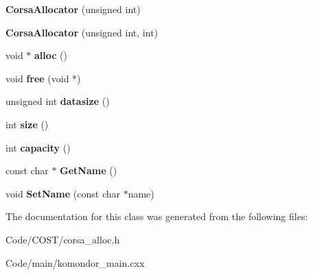 \begin{DoxyCompactItemize}
\mbox{\label{classCorsaAllocator_ac5c54488d1544d2877064a172ea26c68}} 
{\bfseries Corsa\+Allocator} (unsigned int)
\item 
\mbox{\label{classCorsaAllocator_aa4180c34c68b787dcf30e8aad5eb80d2}} 
{\bfseries Corsa\+Allocator} (unsigned int, int)
\item 
\mbox{\label{classCorsaAllocator_a104cedc56c043d4ada9585f5b29b4b52}} 
void $\ast$ {\bfseries alloc} ()
\item 
\mbox{\label{classCorsaAllocator_a3b826bb2f74ba8f778f1db7312c2fb1a}} 
void {\bfseries free} (void $\ast$)
\item 
\mbox{\label{classCorsaAllocator_a4d97e1eee898530930d386df3e48e750}} 
unsigned int {\bfseries datasize} ()
\item 
\mbox{\label{classCorsaAllocator_a3749ea000e4d5fda21ba36256b689f80}} 
int {\bfseries size} ()
\item 
\mbox{\label{classCorsaAllocator_abda8729d4325c3c4204acfb2ba270eed}} 
int {\bfseries capacity} ()
\item 
\mbox{\label{classCorsaAllocator_a5705b3bb6bffefcb11f78d0ca28c55ab}} 
const char $\ast$ {\bfseries Get\+Name} ()
\item 
\mbox{\label{classCorsaAllocator_aab50d589bc0d70a01521438577b7e9da}} 
void {\bfseries Set\+Name} (const char $\ast$name)
\end{DoxyCompactItemize}


The documentation for this class was generated from the following files\+:\begin{DoxyCompactItemize}
\item 
Code/\+C\+O\+S\+T/corsa\+\_\+alloc.\+h\item 
Code/main/komondor\+\_\+main.\+cxx\end{DoxyCompactItemize}
